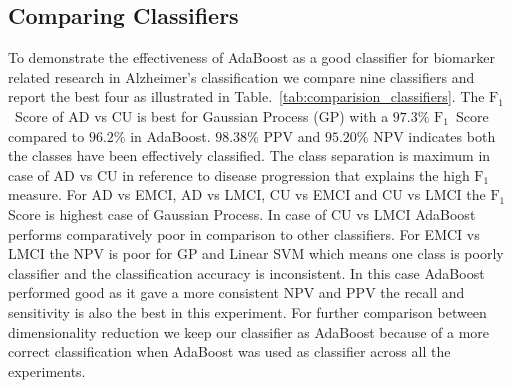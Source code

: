 \documentclass[authoryear,preprint,revi	ew,12pt]{elsarticle}
\newcommand{\Alz} {{Alzheimer\textquoteright s} }
\newcommand{\F}   {$ \textrm{F}_1 $}
\begin{document}
\subsection{Comparing Classifiers}
\label{subsection:classifier_comp}
To demonstrate the effectiveness of AdaBoost as a good classifier for biomarker related research in \Alz classification we compare nine classifiers and report the best four as illustrated in Table.~\ref{tab:comparision_classifiers}. The \F~Score of AD vs CU is best for Gaussian Process (GP) with a $ 97.3 \% $ \F~Score compared to $ 96.2 \% $ in AdaBoost. $ 98.38 \% $ PPV and $ 95.20 \% $ NPV indicates both the classes have been effectively classified. The class separation is maximum in case of AD vs CU in reference to disease progression that explains the high \F measure. For AD vs EMCI, AD vs LMCI, CU vs EMCI and CU vs LMCI the \F Score is highest case of Gaussian Process. In case of CU vs LMCI AdaBoost performs comparatively poor in comparison to other classifiers. For EMCI vs LMCI the NPV is poor for GP and Linear SVM which means one class is poorly classifier and the classification accuracy is inconsistent. In this case AdaBoost performed good as it gave a more consistent NPV and PPV the recall and sensitivity is also the best in this experiment. For further comparison between dimensionality reduction we keep our classifier as AdaBoost because of a more correct classification when AdaBoost was used as classifier across all the experiments.
\clearpage
\end{document}
